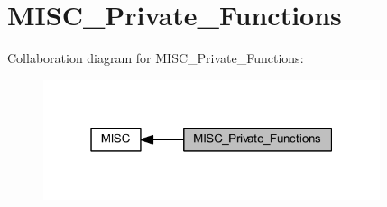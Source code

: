 \hypertarget{group___m_i_s_c___private___functions}{}\section{M\+I\+S\+C\+\_\+\+Private\+\_\+\+Functions}
\label{group___m_i_s_c___private___functions}
Collaboration diagram for M\+I\+S\+C\+\_\+\+Private\+\_\+\+Functions\+:\nopagebreak
\begin{figure}[H]
\begin{center}
\leavevmode
\includegraphics[width=280pt]{group___m_i_s_c___private___functions}
\end{center}
\end{figure}
